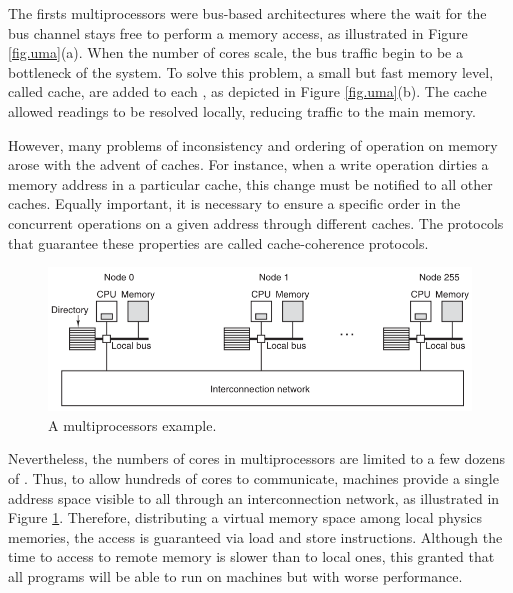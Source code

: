 			The firsts \uma multiprocessors were bus-based architectures where
			the \cpu wait for the bus channel stays free to perform a memory
			access, as illustrated in Figure \ref{fig.uma}(a).
			When the number of cores scale, the bus traffic begin to be a
			bottleneck of the system.
			To solve this problem, a small but fast memory level, called cache,
			are added to each \cpu, as depicted in Figure \ref{fig.uma}(b).
			The cache allowed readings to be resolved locally, reducing traffic
			to the main memory.

			However, many problems of inconsistency and ordering of operation
			on memory arose with the advent of caches.
			For instance, when a write operation dirties a memory address in
			a particular cache, this change must be notified to all other caches.
			Equally important, it is necessary to ensure a specific order in
			the concurrent operations on a given address through different caches.
			The protocols that guarantee these properties are called cache-coherence protocols.

			\begin{figure}[h]
				\centering
				\includegraphics[width=.8\textwidth]{images/numa.png}

				\caption{
					A \numa multiprocessors example.
				}\par
				\label{fig.numa}
			\end{figure}

			Nevertheless, the numbers of cores in \uma multiprocessors are limited
			to a few dozens of \cpus.
			Thus, to allow hundreds of cores to communicate, \numa machines provide
			a single address space visible to all \cpus through an interconnection
			network,  as illustrated in Figure \ref{fig.numa}.
			Therefore, distributing a virtual memory space among local physics memories,
			the access is guaranteed via load and store instructions.
			Although the time to access to remote memory is slower than to local ones,
			this granted that all \uma programs will be able to run on \numa machines
			but with worse performance.

